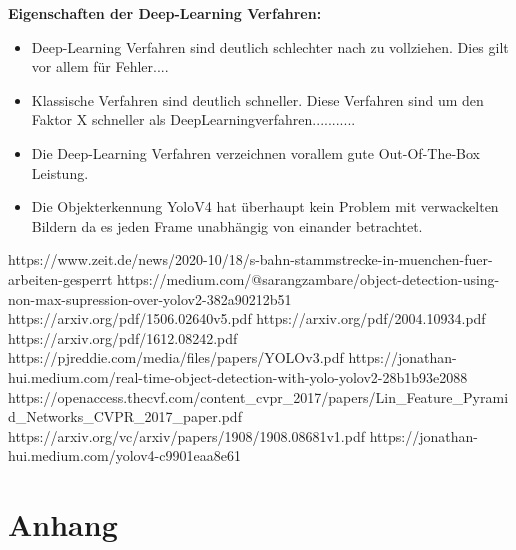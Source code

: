 \documentclass[conference]{IEEEtran}
\begin{document}
	\textbf{Eigenschaften der Deep-Learning Verfahren:}
	\begin{itemize}
		\item Deep-Learning Verfahren sind deutlich schlechter nach zu vollziehen. Dies gilt vor allem für Fehler....
		
		\item Klassische Verfahren sind deutlich schneller. Diese Verfahren sind um den Faktor X schneller als DeepLearningverfahren...........
		
		\item Die Deep-Learning Verfahren verzeichnen vorallem gute Out-Of-The-Box Leistung. 
		
		\item Die Objekterkennung YoloV4 hat überhaupt kein Problem mit verwackelten Bildern da es jeden Frame unabhängig von einander betrachtet.
	\end{itemize}
	
	\begin{thebibliography}{00}
		https://www.zeit.de/news/2020-10/18/s-bahn-stammstrecke-in-muenchen-fuer-arbeiten-gesperrt
		https://medium.com/@sarangzambare/object-detection-using-non-max-supression-over-yolov2-382a90212b51
		https://arxiv.org/pdf/1506.02640v5.pdf
		https://arxiv.org/pdf/2004.10934.pdf %
		https://arxiv.org/pdf/1612.08242.pdf %
		https://pjreddie.com/media/files/papers/YOLOv3.pdf %
		https://jonathan-hui.medium.com/real-time-object-detection-with-yolo-yolov2-28b1b93e2088 %
		https://openaccess.thecvf.com/content\_cvpr\_2017/papers/Lin\_Feature\_Pyramid\_Networks\_CVPR\_2017\_paper.pdf %
		https://arxiv.org/vc/arxiv/papers/1908/1908.08681v1.pdf%
		https://jonathan-hui.medium.com/yolov4-c9901eaa8e61 %
	\end{thebibliography}
	
	\section{Anhang}
	
	
\end{document}
